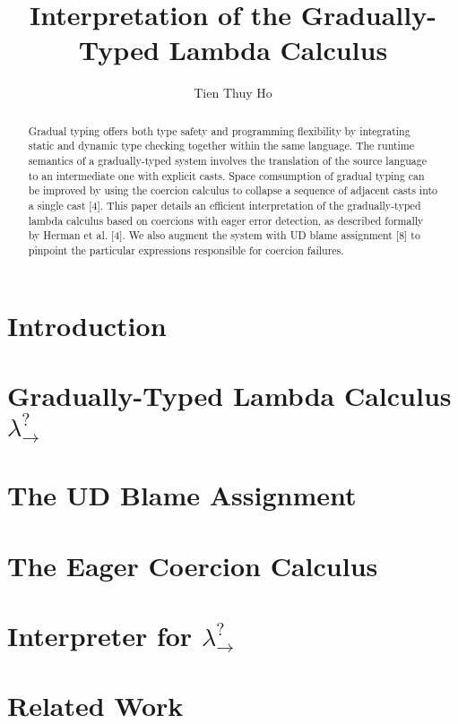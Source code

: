 \documentclass[11pt]{article}
\title{\bf Interpretation of the Gradually-Typed Lambda Calculus}
\author{Tien Thuy Ho}
\begin{document}


\setcounter{page}{3}
\tableofcontents
\listoffigures

\maketitle
{}

\begin{abstract}
Gradual typing offers both type safety and programming flexibility by integrating static and dynamic type checking 
together within the same language. The runtime semantics of a gradually-typed system involves the translation of the 
source language to an intermediate one with explicit casts. Space comsumption of gradual typing can be improved by using 
the coercion calculus to collapse a sequence of adjacent casts into a single cast [4]. This paper details an efficient 
interpretation of the gradually-typed lambda calculus based on coercions with eager error detection, as described formally 
by Herman et al. [4]. We also augment the system with UD blame assignment [8] to pinpoint the particular expressions 
responsible for coercion failures.
\end{abstract}

\section{Introduction} 
\section{Gradually-Typed Lambda Calculus $\lambda ^? _{\rightarrow}$} 
\section{The UD Blame Assignment} 
\section{The Eager Coercion Calculus} 
\section{Interpreter for $\lambda ^? _{\rightarrow}$} 
\section{Related Work} 
\end{document}
